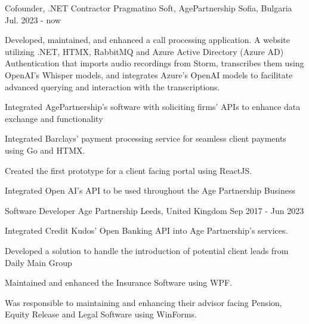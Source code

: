 

\begin{cventries}

  \cventry
    {Cofounder, .NET Contractor} %
    {Pragmatino Soft, AgePartnership} %
    {Sofia, Bulgaria} %
    {Jul. 2023 - now} %
    {
      \begin{cvitems} %
        \item {Developed, maintained, and enhanced a call processing application. A website utilizing .NET, HTMX, RabbitMQ and Azure Active Directory (Azure AD) Authentication that imports audio recordings from Storm, transcribes them using OpenAI's Whisper models, and integrates Azure's OpenAI models to facilitate advanced querying and interaction with the transcriptions.}
         \item {Integrated AgePartnership's software with soliciting firms' APIs to enhance data exchange and functionality }
        \item {Integrated Barclays' payment processing service for seamless client payments using Go and HTMX.}
        \item {Created the first prototype for a client facing portal using ReactJS. }
        \item {Integrated Open AI's API to be used throughout the Age Partnership Business}
      \end{cvitems}
    }

  \cventry
    {Software Developer} %
    {Age Partnership} %
    {Leeds, United Kingdom} %
    {Sep 2017 - Jun 2023} %
    {
      \begin{cvitems} %
        \item {Integrated Credit Kudos' Open Banking API into Age Partnership's services. }
        \item {Developed a solution to handle the introduction of potential client leads from Daily Main Group }
        \item {Maintained and enhanced the Insurance Software using WPF.}
        \item {Was responsible to maintaining and enhancing their advisor facing Pension, Equity Release and Legal Software using WinForms.}
      \end{cvitems}
    }

\end{cventries}
